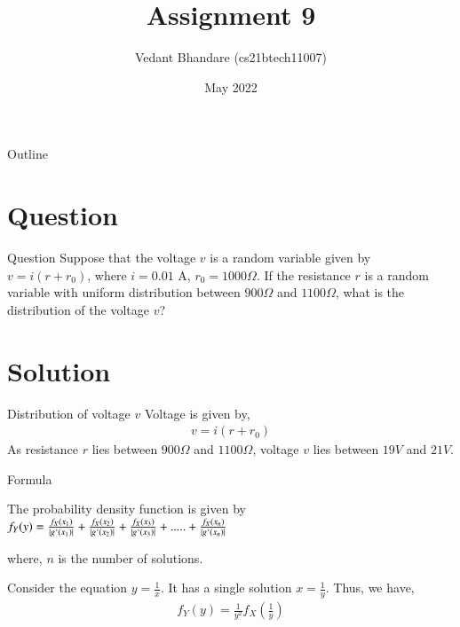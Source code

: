 \documentclass{beamer}
\title{Assignment 9}
\author{Vedant Bhandare (cs21btech11007)}
\date{May 2022}
\begin{document}
\begin{frame}
    \titlepage 
\end{frame}

\logo{}


\begin{frame}{Outline}
    \tableofcontents
\end{frame}

\section{Question}
\begin{frame}{Question}
    Suppose that the voltage $v$ is a random variable given by $v=i(r+r_0)$, where $i= 0.01$ A, $r_0 = 1000 \Omega$. If the resistance $r$ is a random variable with uniform distribution between $900 \Omega$ and $1100 \Omega$, what is the distribution of the voltage $v$?
\end{frame}

\section{Solution}
\begin{frame}{Distribution of voltage $v$}
    Voltage is given by,
    \begin{align}
        v=i(r+r_0)
    \end{align}
    As resistance $r$ lies between $900 \Omega$ 
    and $1100 \Omega$, voltage $v$ lies between $19 V$ and $21 V$.\\
\end{frame}

\begin{frame}{Formula}
\begin{block}{The probability density function is given by}
    \centering
    $f_Y(y) = \frac{f_X(x_1)}{|g`(x_1)|} + \frac{f_X(x_2)}{|g`(x_2)|} + \frac{f_X(x_3)}{|g`(x_3)|} + ..... + \frac{f_X(x_n)}{|g`(x_n)|}$
\end{block}
    where, $n$ is the number of solutions.
\end{frame}

\begin{frame}
    Consider the equation $y = \frac{1}{x}$. It has a single solution $x = \frac{1}{y}$. Thus, we have,
    \begin{align}
        f_Y(y) = \frac{1}{y^2} f_X(\frac{1}{y})
    \end{align}
\end{frame}
\end{document}
